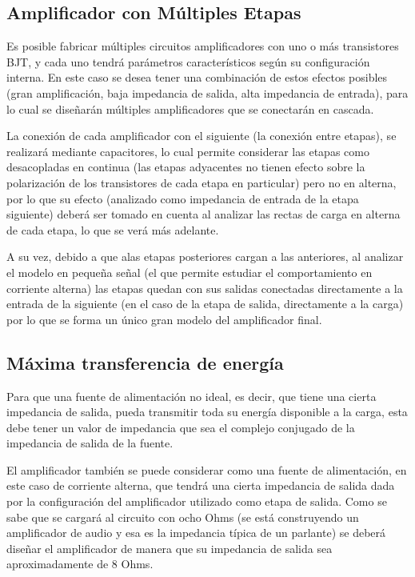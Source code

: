 \subsection{Amplificador con Múltiples Etapas}

Es posible fabricar múltiples circuitos amplificadores con uno o más transistores BJT, y cada uno tendrá parámetros característicos según su configuración interna. En este caso se desea tener una combinación de estos efectos posibles (gran amplificación, baja impedancia de salida, alta impedancia de entrada), para lo cual se diseñarán múltiples amplificadores que se conectarán en cascada.

La conexión de cada amplificador con el siguiente (la conexión entre etapas), se realizará mediante capacitores, lo cual permite considerar las etapas como desacopladas en continua (las etapas adyacentes no tienen efecto sobre la polarización de los transistores de cada etapa en particular) pero no en alterna, por lo que su efecto (analizado como impedancia de entrada de la etapa siguiente) deberá ser tomado en cuenta al analizar las rectas de carga en alterna de cada etapa, lo que se verá más adelante.

A su vez, debido a que alas etapas posteriores cargan a las anteriores, al analizar el modelo en pequeña señal (el que permite estudiar el comportamiento en corriente alterna) las etapas quedan con sus salidas conectadas directamente a la entrada de la siguiente (en el caso de la etapa de salida, directamente a la carga) por lo que se forma un único gran modelo del amplificador final.

\subsection{Máxima transferencia de energía}

Para que una fuente de alimentación no ideal, es decir, que tiene una cierta impedancia de salida, pueda transmitir toda su energía disponible a la carga, esta debe tener un valor de impedancia que sea el complejo conjugado de la impedancia de salida de la fuente.

El amplificador también se puede considerar como una fuente de alimentación, en este caso de corriente alterna, que tendrá una cierta impedancia de salida dada por la configuración del amplificador utilizado como etapa de salida. Como se sabe que se cargará al circuito con ocho Ohms (se está construyendo un amplificador de audio y esa es la impedancia típica de un parlante) se deberá diseñar el amplificador de manera que su impedancia de salida sea aproximadamente de 8 Ohms.

